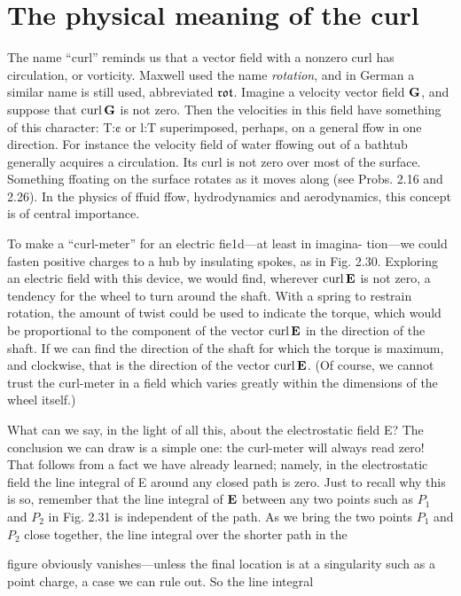 \iffalse

\section{The physical meaning of the curl}

The name ``curl'' reminds us that a vector field with a nonzero curl
has circulation, or vorticity. Maxwell used the name \emph{rotation}, and
in German a similar name is still used, abbreviated $\frak{rot}$. Imagine
a velocity vector field $\mathbf{G}$, and suppose that $\operatorname{curl}\mathbf{G}$ is not zero. Then
the velocities in this field have something of this character: T:¢ or
l:T superimposed, perhaps, on a general ffow in one direction. For
instance the velocity field of water ffowing out of a bathtub generally
acquires a circulation. Its curl is not zero over most of the surface.
Something ffoating on the surface rotates as it moves along (see
Probs. 2.16 and 2.26). In the physics of ffuid ffow, hydrodynamics
and aerodynamics, this concept is of central importance.

To make a ``curl-meter'' for an electric fie1d---at least in imagina-
tion---we could fasten positive charges to a hub by insulating spokes,
as in Fig. 2.30. Exploring an electric field with this device, we would
find, wherever $\operatorname{curl}\mathbf{E}$ is not zero, a tendency for the wheel to turn
around the shaft. With a spring to restrain rotation, the amount of
twist could be used to indicate the torque, which would be proportional
to the component of the vector $\operatorname{curl}\mathbf{E}$ in the direction of the
shaft. If we can find the direction of the shaft for which the torque
is maximum, and clockwise, that is the direction of the vector $\operatorname{curl}\mathbf{E}$.
(Of course, we cannot trust the curl-meter in a field which varies
greatly within the dimensions of the wheel itself.)

What can we say, in the light of all this, about the electrostatic
field E? The conclusion we can draw is a simple one: the curl-meter
will always read zero! That follows from a fact we have already
learned; namely, in the electrostatic field the line integral of E
around any closed path is zero. Just to recall why this is so, remember
that the line integral of $\mathbf{E}$ between any two points such as $P_1$ and
$P_2$ in Fig. 2.31 is independent of the path. As we bring the two points
$P_1$ and $P_2$ close together, the line integral over the shorter path in the

figure obviously vanishes---unless the final location is at a singularity
such as a point charge, a case we can rule out. So the line integral

